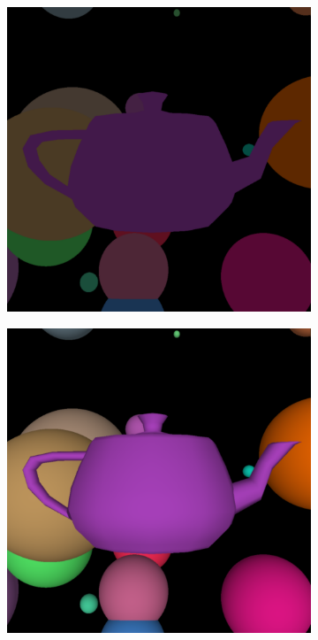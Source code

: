 \documentclass[a4paper,11pt]{article}%
\begin{document}
\begin{figure}[h]
    \centering
    
\begin{subfigure}{.3\textwidth}
  \centering
  \includegraphics[width=.9\linewidth]{img/ambientteapot.png}
\end{subfigure}%
\begin{subfigure}{.3\textwidth}
  \centering
  \includegraphics[width=.9\linewidth]{img/diffuseteapot.png}

\end{subfigure}
\end{figure}
\end{document}
